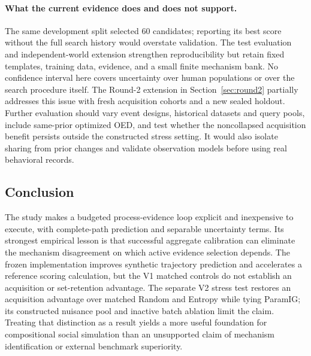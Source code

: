 \paragraph{What the current evidence does and does not support.}
The same development split selected 60 candidates; reporting its best score without the full search history would overstate validation. The test evaluation and independent-world extension strengthen reproducibility but retain fixed templates, training data, evidence, and a small finite mechanism bank. No confidence interval here covers uncertainty over human populations or over the search procedure itself. The Round-2 extension in Section~\ref{sec:round2} partially addresses this issue with fresh acquisition cohorts and a new sealed holdout. Further evaluation should vary event designs, historical datasets and query pools, include same-prior optimized OED, and test whether the noncollapsed acquisition benefit persists outside the constructed stress setting. It would also isolate sharing from prior changes and validate observation models before using real behavioral records.

\subsection{Conclusion}
The study makes a budgeted process-evidence loop explicit and inexpensive to execute, with complete-path prediction and separable uncertainty terms. Its strongest empirical lesson is that successful aggregate calibration can eliminate the mechanism disagreement on which active evidence selection depends. The frozen implementation improves synthetic trajectory prediction and accelerates a reference scoring calculation, but the V1 matched controls do not establish an acquisition or set-retention advantage. The separate V2 stress test restores an acquisition advantage over matched Random and Entropy while tying ParamIG; its constructed nuisance pool and inactive batch ablation limit the claim. Treating that distinction as a result yields a more useful foundation for compositional social simulation than an unsupported claim of mechanism identification or external benchmark superiority.
